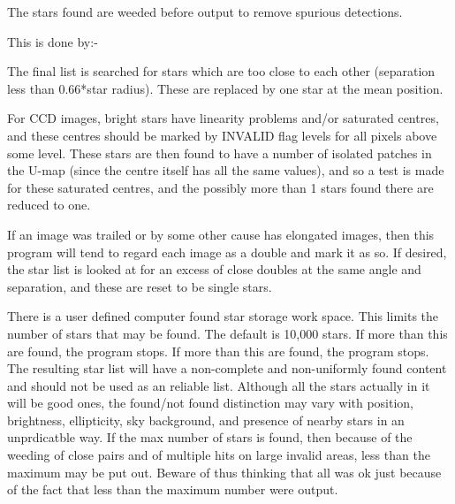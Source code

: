 \begin{small}
{{ The stars found are weeded before output to remove spurious
 detections.
 
 This is done by:-
 
\begin{list}{{-}}{}
 
 \item The final list is searched for stars which are too close
    to each other (separation less than 0.66*star radius). These
    are replaced by one star at the mean position.
 
 \item For CCD images, bright stars have linearity problems and/or
    saturated centres, and these centres should be marked by
    INVALID flag levels for all pixels above some level. These
    stars are then found to have a number of isolated patches
    in the U-map (since the centre itself has all the same values),
    and so a test is made for these saturated centres, and the
    possibly more than 1 stars found there are reduced to one.
 
 \item If an image was trailed or by some other cause has elongated
    images, then this program will tend to regard each image
    as a double and mark it as so. If desired, the star list
    is looked at for an excess of close doubles at the same
    angle and separation, and these are reset to be single stars.
\end{list}
 
 \vspace*{1mm}
 \hspace*{2em}{\bf Maximum Number}
 \vspace*{1mm}
 
 There is a user defined computer found star storage work space.
 This limits the number of stars that may be found. The default is
 10,000 stars. If more than this are found, the program stops.
 If more than this are found, the program stops. The resulting star
 list will have a non-complete and non-uniformly found content and
 should not be used as an reliable list. Although all the stars
 actually in it will be good ones, the found/not found distinction
 may vary with position, brightness, ellipticity, sky background,
 and presence of nearby stars in an unprdicatble way. If the
 max number of stars is found, then because of the weeding of close
 pairs and of multiple hits on large invalid areas, less than the
 maximum may be put out. Beware of thus thinking that all was ok
 just because of the fact that less than the maximum number were
 output.
 
}}
\end{small}
